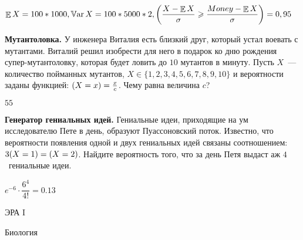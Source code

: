 \documentclass[12pt, addpoints]{exam} %
\DeclareMathOperator{\E}{\mathbb{E}}
\DeclareMathOperator{\Var}{\mathbb{V}\mathrm{ar}}
\let\P\relax
\DeclareMathOperator{\P}{\mathbb{P}}
\renewcommand{\ge}{\geqslant}
\begin{document}
\begin{questions}
\begin{solution}
$ \E X = 100*1000, \Var X = 100* 5000*2,
\P \left(\dfrac{X - \E X}{\sigma} \ge \dfrac{Money - \E X}{\sigma}  \right) = 0,95$
\end{solution}

\question \textbf{Мутантоловка.} У инженера Виталия есть близкий друг, который устал воевать с мутантами. Виталий решил изобрести для него в подарок ко дню рождения супер-мутантоловку, которая будет ловить до $10$ мутантов в минуту. Пусть $X$~--- количество пойманных мутантов, $X \in \{1, 2, 3, 4, 5, 6, 7, 8, 9, 10\}$ и вероятности заданы функцией: $\P(X=x) = \frac{x}{c}$. Чему равна величина $c$?
\begin{solution}
$55$
\end{solution}


\question \textbf{Генератор гениальных идей.} Гениальные идеи, приходящие на ум исследователю Пете в день, образуют Пуассоновский поток. Известно, что вероятности появления одной и двух гениальных идей связаны соотношением:  $3\P(X=1) = \P(X=2)$. Найдите вероятность того, что за день Петя выдаст аж $4$~гениальные идеи.
\begin{solution}
$e^{-6}\cdot\dfrac{6^4}{4!}=0.13$
\end{solution}


\end{questions}


\newpage

\begin{center}
ЭРА I
\end{center}

\begin{center}
Биология
\end{center}
\end{document}
